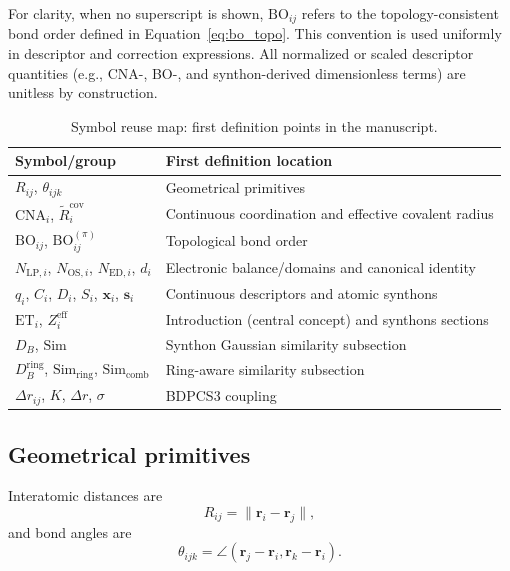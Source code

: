 \documentclass[journal=jctcce,manuscript=article]{achemso}
\begin{document}
For clarity, when no superscript is shown, $\mathrm{BO}_{ij}$ refers to the topology-consistent bond order defined in Equation~\ref{eq:bo_topo}. This convention is used uniformly in descriptor and correction expressions.
All normalized or scaled descriptor quantities (e.g., CNA-, BO-, and synthon-derived dimensionless terms) are unitless by construction.

\begin{table}[ht]
\caption{Symbol reuse map: first definition points in the manuscript.}
\label{tab:symbol_reuse}
\centering
\begin{tabular}{ll}
\toprule
Symbol/group & First definition location \\
\midrule
$R_{ij}$, $\theta_{ijk}$ & Geometrical primitives \\
$\mathrm{CNA}_i$, $\tilde R_i^{\mathrm{cov}}$ & Continuous coordination and effective covalent radius \\
$\mathrm{BO}_{ij}$, $\mathrm{BO}^{(\pi)}_{ij}$ & Topological bond order \\
$N_{\mathrm{LP},i}$, $N_{\mathrm{OS},i}$, $N_{\mathrm{ED},i}$, $d_i$ & Electronic balance/domains and canonical identity \\
$q_i$, $C_i$, $D_i$, $S_i$, $\mathbf{x}_i$, $\mathbf{s}_i$ & Continuous descriptors and atomic synthons \\
$\mathrm{ET}_i$, $Z_i^{\mathrm{eff}}$ & Introduction (central concept) and synthons sections \\
$D_B$, $\mathrm{Sim}$ & Synthon Gaussian similarity subsection \\
$D_B^{\mathrm{ring}}$, $\mathrm{Sim}_{\mathrm{ring}}$, $\mathrm{Sim}_{\mathrm{comb}}$ & Ring-aware similarity subsection \\
$\Delta r_{ij}$, $K$, $\Delta r$, $\sigma$ & BDPCS3 coupling \\
\bottomrule
\end{tabular}
\end{table}

\subsection{Geometrical primitives}
Interatomic distances are
\begin{equation}
R_{ij}=\lVert\mathbf{r}_i-\mathbf{r}_j\rVert,
\end{equation}
and bond angles are
\begin{equation}
\theta_{ijk}=\angle(\mathbf{r}_j-\mathbf{r}_i,\mathbf{r}_k-\mathbf{r}_i).
\end{equation}
\end{document}
